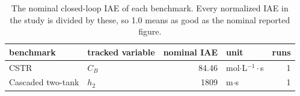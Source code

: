 \begin{table}
\caption{The nominal closed-loop IAE of each benchmark. Every normalized IAE in the study is divided by these, so 1.0 means as good as the nominal reported figure.}
\label{tab:T5_normalizers}
\begin{tabular}{llrlr}
\toprule
benchmark & tracked variable & nominal IAE & unit & runs \\
\midrule
CSTR & $C_B$ & 84.46 & mol$\cdot$L$^{-1}\cdot$s & 1 \\
Cascaded two-tank & $h_2$ & 1809 & m$\cdot$s & 1 \\
\bottomrule
\end{tabular}
\end{table}
